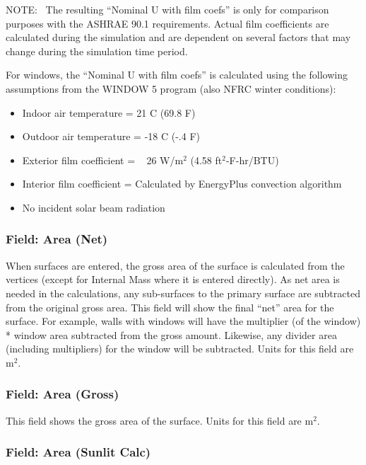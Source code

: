 NOTE:~ The resulting ``Nominal U with film coefs'' is only for comparison purposes with the ASHRAE 90.1 requirements. Actual film coefficients are calculated during the simulation and are dependent on several factors that may change during the simulation time period.

For windows, the ``Nominal U with film coefs'' is calculated using the following assumptions from the WINDOW 5 program (also NFRC winter conditions):

\begin{itemize}
\item
  Indoor air temperature = 21 C (69.8 F)
\item
  Outdoor air temperature = -18 C (-.4 F)
\item
  Exterior film coefficient = ~ 26 W/m\(^{2}\) (4.58 ft\(^{2}\)-F-hr/BTU)
\item
  Interior film coefficient = Calculated by EnergyPlus convection algorithm
\item
  No incident solar beam radiation
\end{itemize}

\subsubsection{Field: Area (Net)}\label{field-area-net}

When surfaces are entered, the gross area of the surface is calculated from the vertices (except for Internal Mass where it is entered directly). As net area is needed in the calculations, any sub-surfaces to the primary surface are subtracted from the original gross area. This field will show the final ``net'' area for the surface. For example, walls with windows will have the multiplier (of the window) * window area subtracted from the gross amount. Likewise, any divider area (including multipliers) for the window will be subtracted. Units for this field are m\(^{2}\).

\subsubsection{Field: Area (Gross)}\label{field-area-gross}

This field shows the gross area of the surface. Units for this field are m\(^{2}\).

\subsubsection{Field: Area (Sunlit Calc)}\label{field-area-sunlit-calc}

